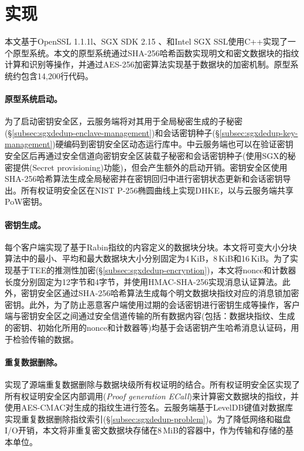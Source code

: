 \section{\sysnameS 实现}
\label{sec:sgxdedup-implementation}

本文基于OpenSSL 1.1.1l\cite{openssl}、SGX SDK 2.15\cite{sgxsdk} 、和Intel SGX SSL\cite{sgxssl}使用C++实现了一个\sysnameS 原型系统。本文的原型系统通过SHA-256哈希函数实现明文和密文数据块的指纹计算和识别等操作，并通过AES-256加密算法实现基于数据块的加密机制。原型系统约包含14,200行代码。

\paragraph*{原型系统启动。}
为了启动密钥安全区，云服务端将对其用于全局秘密生成的子秘密(\S\ref{subsec:sgxdedup-enclave-management})和会话密钥种子(\S\ref{subsec:sgxdedup-key-management})硬编码到密钥安全区动态运行库中。\sysnameS 中云服务端也可以在验证密钥安全区后再通过安全信道向密钥安全区装载子秘密和会话密钥种子(使用SGX\cite{sgx}的秘密提供(Secret provisioning)功能)，但会产生额外的启动开销。密钥安全区使用SHA-256哈希算法生成全局秘密并在密钥回归中进行密钥状态更新和会话密钥导出。所有权证明安全区在NIST P-256椭圆曲线\cite{nist}上实现DHKE，以与云服务端共享PoW密钥。

\paragraph*{密钥生成。}每个客户端实现了基于Rabin指纹\cite{rabin81}的内容定义的数据块分块。本文将可变大小分块算法中的最小、平均和最大数据块大小分别固定为4\,KiB，8\,KiB和16\,KiB。为了实现基于TEE的推测性加密(\S\ref{subsec:sgxdedup-encryption})，本文将nonce和计数器长度分别固定为12字节和4字节，并使用HMAC-SHA-256实现消息认证算法。此外，密钥安全区通过SHA-256哈希算法生成每个明文数据块指纹对应的消息锁加密密钥。此外，为了防止恶意客户端使用过期的会话密钥进行密钥生成等操作，客户端与密钥安全区之间通过安全信道传输的所有数据内容(包括：数据块指纹、生成的密钥、初始化所用的nonce和计数器等)均基于会话密钥产生哈希消息认证码，用于检验传输的数据。

\paragraph*{重复数据删除。}\sysnameS 实现了源端重复数据删除与数据块级所有权证明的结合。所有权证明安全区实现了所有权证明安全区内部调用(\textit{Proof generation ECall})来计算密文数据块的指纹，并使用AES-CMAC对生成的指纹生进行签名。云服务端基于LevelDB\cite{leveldb}键值对数据库实现重复数据删除指纹索引(\S\ref{subsec:sgxdedup-problem})。为了降低网络和磁盘I/O开销，本文将非重复密文数据块存储在8\,MiB的容器中，作为传输和存储的基本单位\cite{lillibridge13}。

